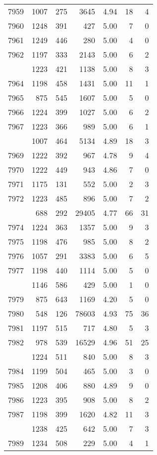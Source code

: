 \documentclass[
]{article}
\begin{document}
\begin{table}
\begin{tabular}[t]{lrrrrrr}
7959 & 1007 & 275 & 3645 & 4.94 & 18 & 4\\
7960 & 1248 & 391 & 427 & 5.00 & 7 & 0\\
7961 & 1249 & 446 & 280 & 5.00 & 4 & 0\\
7962 & 1197 & 333 & 2143 & 5.00 & 6 & 2\\
\addlinespace
7963 & 1223 & 421 & 1138 & 5.00 & 8 & 3\\
7964 & 1198 & 458 & 1431 & 5.00 & 11 & 1\\
7965 & 875 & 545 & 1607 & 5.00 & 5 & 0\\
7966 & 1224 & 399 & 1027 & 5.00 & 6 & 2\\
7967 & 1223 & 366 & 989 & 5.00 & 6 & 1\\
\addlinespace
7968 & 1007 & 464 & 5134 & 4.89 & 18 & 3\\
7969 & 1222 & 392 & 967 & 4.78 & 9 & 4\\
7970 & 1222 & 449 & 943 & 4.86 & 7 & 0\\
7971 & 1175 & 131 & 552 & 5.00 & 2 & 3\\
7972 & 1223 & 485 & 896 & 5.00 & 7 & 2\\
\addlinespace
7973 & 688 & 292 & 29405 & 4.77 & 66 & 31\\
7974 & 1224 & 363 & 1357 & 5.00 & 9 & 3\\
7975 & 1198 & 476 & 985 & 5.00 & 8 & 2\\
7976 & 1057 & 291 & 3383 & 5.00 & 6 & 5\\
7977 & 1198 & 440 & 1114 & 5.00 & 5 & 0\\
\addlinespace
7978 & 1146 & 586 & 429 & 5.00 & 1 & 0\\
7979 & 875 & 643 & 1169 & 4.20 & 5 & 0\\
7980 & 548 & 126 & 78603 & 4.93 & 75 & 36\\
7981 & 1197 & 515 & 717 & 4.80 & 5 & 3\\
7982 & 978 & 539 & 16529 & 4.96 & 51 & 25\\
\addlinespace
7983 & 1224 & 511 & 840 & 5.00 & 8 & 3\\
7984 & 1199 & 504 & 465 & 5.00 & 3 & 0\\
7985 & 1208 & 406 & 880 & 4.89 & 9 & 0\\
7986 & 1223 & 395 & 908 & 5.00 & 8 & 2\\
7987 & 1198 & 399 & 1620 & 4.82 & 11 & 3\\
\addlinespace
7988 & 1238 & 425 & 642 & 5.00 & 7 & 3\\
7989 & 1234 & 508 & 229 & 5.00 & 4 & 1\\

\end{tabular}
\end{table}
\end{document}
